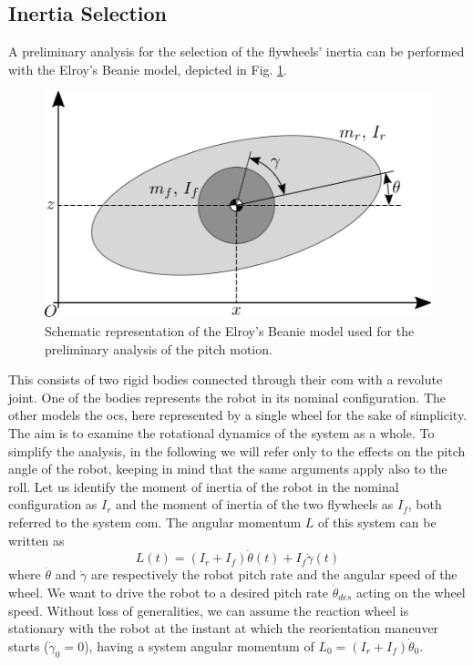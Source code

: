 \documentclass[letterpaper, 10 pt, conference]{ieeeconf}  %
\begin{document}
\subsection{Inertia Selection}
A preliminary analysis for the selection of the flywheels' inertia can be performed with the Elroy's Beanie model, depicted in Fig. \ref{fig:elroy-beanie}.
\begin{figure}
	\centering
	\includegraphics[width=.7\linewidth]{figures/elroys-beanie.eps}
	\caption{\small Schematic representation of the Elroy's Beanie model used for the preliminary analysis of the pitch motion.}
	\label{fig:elroy-beanie}
\end{figure} 
This consists of two rigid bodies connected through their \gls{com} with a revolute joint. One of the bodies represents the robot in its nominal configuration. The other models the \gls{ocs}, here represented by a single wheel for the sake of simplicity. The aim is to examine the rotational dynamics of the system as a whole. To simplify the analysis, in the following we will refer only to the effects on the pitch angle of the robot, keeping in mind that the same arguments apply also to the roll. 
Let us identify the moment of inertia of the robot in the nominal configuration as $I_r$ and the moment of inertia of the two flywheels as $I_f$, both referred to the system \gls{com}.
The angular momentum $L$ of this system can be written as
\begin{equation}\label{eq:ang_mom_elroy}
L(t) = \left(I_r + I_{f}\right)\dot{\theta}(t) + I_{f}\dot{\gamma}(t)
\end{equation}
where $\dot{\theta}$ and $\dot{\gamma}$ are respectively the robot pitch rate and the angular speed of the wheel.
We want to drive the robot to a desired pitch rate $\dot{\theta}_{des}$ acting on the wheel speed.
Without loss of generalities, we can assume the reaction wheel is stationary with the robot at the instant at which the reorientation maneuver starts ($\dot{\gamma}_0 = 0$), having a system angular momentum of $L_0 = \left(I_r + I_{f}\right)\dot{\theta}_0$.
\end{document}
